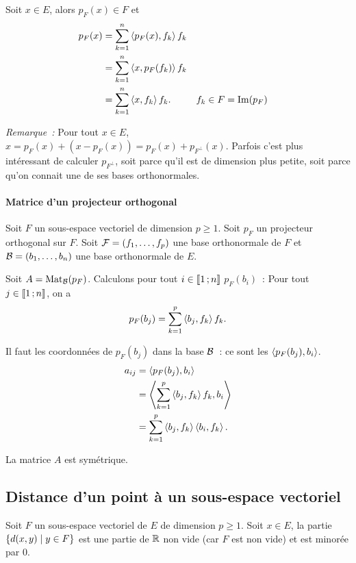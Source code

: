     Soit \(x \in E\), alors \(p_F(x) \in F\) et
    \begin{align}
      p_F(x) &=\sum_{k=1}^n \left\langle{p_F(x)},{f_k}\right\rangle f_k \\
             &=\sum_{k=1}^n \left\langle{x},{p_F(f_k)}\right\rangle f_k \\
             &=\sum_{k=1}^n \left\langle{x},{f_k}\right\rangle f_k. && f_k \in F=\operatorname{Im}(p_F)
    \end{align}

    \emph{Remarque~:} Pour tout \(x \in E\), \(x = p_F(x) +(x-p_F(x)) = p_F(x) + p_{F^\perp}(x)\). Parfois c'est plus intéressant de calculer \(p_{F^\perp}\), soit parce qu'il est de dimension plus petite, soit parce qu'on connait une de ses bases orthonormales.

    \paragraph{Matrice d'un projecteur orthogonal}
    Soit \(F\) un sous-espace vectoriel de dimension \(p \geqslant 1\). Soit \(p_F\) un projecteur orthogonal sur \(F\). Soit \(\mathcal{F}=(f_1, \ldots, f_p)\) une base orthonormale de \(F\) et \(\mathcal{B}=(b_1, \ldots, b_n)\) une base orthonormale de \(E\).

    Soit \(A=\mathrm{Mat}_{\mathcal{B}}(p_F)\). Calculons pour tout \(i \in \mathopen{\llbracket}1\mathclose{}\mathpunct{};n\mathclose{\rrbracket}\) \(p_F(b_i)\)~: Pour tout \(j \in \mathopen{\llbracket}1\mathclose{}\mathpunct{};n\mathclose{\rrbracket}\), on a
    \begin{equation}
      p_F(b_j)=\sum_{k=1}^p \left\langle{b_j},{f_k}\right\rangle f_k.
    \end{equation}

    Il faut les coordonnées de \(p_F(b_j)\) dans la base \(\mathcal{B}\)~: ce sont les \(\left\langle{p_F(b_j)},{b_i}\right\rangle\).
    \begin{align}
      a_{ij} &= \left\langle{p_F(b_j)},{b_i}\right\rangle \\
             &= \left\langle{\sum_{k=1}^p \left\langle{b_j},{f_k}\right\rangle f_k},{b_i}\right\rangle \\
             &= \sum_{k=1}^p \left\langle{b_j},{f_k}\right\rangle \left\langle{b_i},{f_k}\right\rangle.
    \end{align}

    La matrice \(A\) est symétrique.

    \subsection{Distance d'un point à un sous-espace vectoriel}

    Soit \(F\) un sous-espace vectoriel de \(E\) de dimension \(p \geqslant 1\). Soit \(x \in E\), la partie \(\left\{d(x,y)\mathrel{}\middle|\mathrel{}y \in F\right\}\) est une partie de \(\mathbb{R}\) non vide (car \(F\) est non vide) et est minorée par \(0\).

